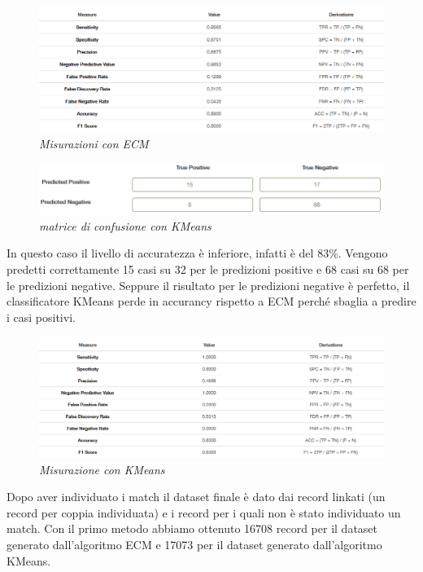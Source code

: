 \documentclass[a4paper,12pt]{article}
\begin{document}
\begin{figure}[H]
	\centering
	\includegraphics[width=1\linewidth]{img/analysis_ecm.png}
	\caption{\textit{Misurazioni con ECM}}
\end{figure}


\begin{figure}[H]
	\centering
	\includegraphics[width=0.8\linewidth]{img/confusion_kmeans.png}
	\caption{\textit{matrice di confusione con KMeans}}
\end{figure}

\noindent In questo caso il livello di accuratezza è inferiore, infatti è del 83\%. Vengono predetti correttamente 15 casi su 32 per le predizioni positive e 68 casi su 68 per le predizioni negative. Seppure il risultato per le predizioni negative è perfetto, il classificatore KMeans perde in accurancy rispetto a ECM perché sbaglia a predire i casi positivi. 

\begin{figure}[H]
	\centering
	\includegraphics[width=1\linewidth]{img/analysis_kmeans.png}
	\caption{\textit{Misurazione con KMeans}}
\end{figure}

\noindent Dopo aver individuato i match il dataset finale è dato dai record linkati (un record per coppia individuata) e i record per i quali non è stato individuato un match.
Con il primo metodo abbiamo ottenuto 16708 record per il dataset generato dall'algoritmo ECM e 17073 per il dataset generato dall'algoritmo KMeans. 
\newpage
\end{document}
